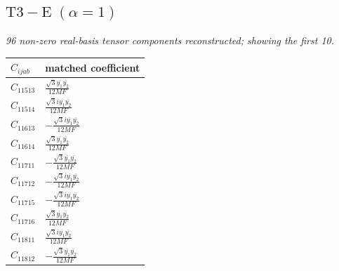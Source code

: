 \documentclass[9pt]{article}
\begin{document}
\subsection*{$ \mathrm{T3-E}\;(\alpha=1) $}
\textit{96 non-zero real-basis tensor components reconstructed; showing the first 10.}
\begin{longtable}{@{}ll@{}}
\toprule
$C_{ijab}$ & matched coefficient \\
\midrule
$C_{11513}$ & $ \frac{\sqrt{3} \overline{y_{1}} \overline{y_{2}}}{12 MF} $ \\
$C_{11514}$ & $ \frac{\sqrt{3} i \overline{y_{1}} \overline{y_{2}}}{12 MF} $ \\
$C_{11613}$ & $ - \frac{\sqrt{3} i \overline{y_{1}} \overline{y_{2}}}{12 MF} $ \\
$C_{11614}$ & $ \frac{\sqrt{3} \overline{y_{1}} \overline{y_{2}}}{12 MF} $ \\
$C_{11711}$ & $ - \frac{\sqrt{3} \overline{y_{1}} \overline{y_{2}}}{12 MF} $ \\
$C_{11712}$ & $ - \frac{\sqrt{3} i \overline{y_{1}} \overline{y_{2}}}{12 MF} $ \\
$C_{11715}$ & $ - \frac{\sqrt{3} i \overline{y_{1}} \overline{y_{2}}}{12 MF} $ \\
$C_{11716}$ & $ \frac{\sqrt{3} \overline{y_{1}} \overline{y_{2}}}{12 MF} $ \\
$C_{11811}$ & $ \frac{\sqrt{3} i \overline{y_{1}} \overline{y_{2}}}{12 MF} $ \\
$C_{11812}$ & $ - \frac{\sqrt{3} \overline{y_{1}} \overline{y_{2}}}{12 MF} $ \\
\bottomrule
\end{longtable}
\end{document}
